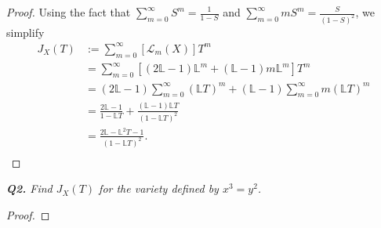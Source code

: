 \documentclass{article}
\begin{document}
\begin{proof}
  Using the fact that $\displaystyle\sum_{m=0}^\infty S^m =\frac{1}{1-S}$
  and $\displaystyle\sum_{m=0}^\infty mS^m =\frac{S}{(1-S)^2}$, we simplify
  \begin{align*}
    J_X(T) &:=\sum_{m=0}^\infty [\mathcal{L}_m(X)]T^m\\
      &=\sum_{m=0}^\infty [(2\mathbb{L}-1)\mathbb{L}^m
        +(\mathbb{L}-1)m\mathbb{L}^m] T^m\\
      &=(2\mathbb{L}-1) \sum_{m=0}^\infty (\mathbb{L}T)^m +(\mathbb{L}-1)
        \sum_{m=0}^\infty m(\mathbb{L}T)^m\\
      &=\frac{2\mathbb{L}-1}{1-\mathbb{L}T}
        +\frac{(\mathbb{L}-1)\mathbb{L}T}{(1-\mathbb{L}T)^2}\\
      &=\frac{2\mathbb{L}-\mathbb{L}^2T-1}{(1-\mathbb{L}T)^2}.\\
  \end{align*}
\end{proof}

\it \textbf{Q2.} Find $J_X(T)$ for the variety defined by $x^3=y^2$.
\begin{proof}
\end{proof}
\end{document}
